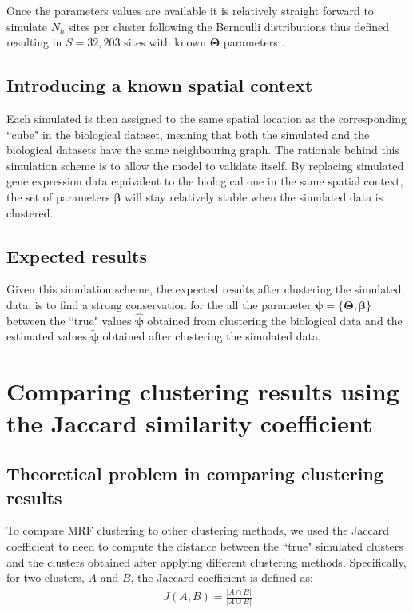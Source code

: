 	Once the parameters values are available it is relatively straight forward to simulate $N_h$ sites per cluster following the Bernoulli distributions thus defined resulting in $S=32,203$ sites with known $\boldsymbol{\Theta}$ parameters .
	\subsection{Introducing a known spatial context}\label{subsec:simul_spatial}
	Each simulated is then assigned to the same spatial location as the corresponding ``cube" in the biological dataset, meaning that both the simulated and the biological datasets have the same neighbouring graph. The rationale behind this simulation scheme is to allow the model to validate itself. By replacing simulated gene expression data equivalent to the biological one in the same spatial context, the set of parameters $\boldsymbol{\beta}$ will stay relatively stable when the simulated data is clustered.
	\subsection{Expected results}\label{subsec:expected_simul_results}
	Given this simulation scheme, the expected results after clustering the simulated data, is to find a strong conservation for the all the parameter $\boldsymbol{\psi} = \{\boldsymbol{\Theta},\boldsymbol{\beta}\}$ between the ``true" values $\hat{\boldsymbol{\psi}}$ obtained from clustering the biological data and the estimated values $\widetilde{\boldsymbol{\psi}}$ obtained after clustering the simulated data.

\section{Comparing clustering results using the Jaccard similarity coefficient}
	\subsection{Theoretical problem in comparing clustering results}
To compare MRF clustering to other clustering methods, we used the Jaccard coefficient \cite{jaccard1901} to need to compute the distance between the ``true" simulated clusters and the clusters obtained after applying different clustering methods. Specifically, for two clusters, $A$ and $B$, the Jaccard coefficient is defined as: 
\begin{align*}
J(A,B) = \frac{|A \cap B|}{|A \cup B|}
\end{align*}


